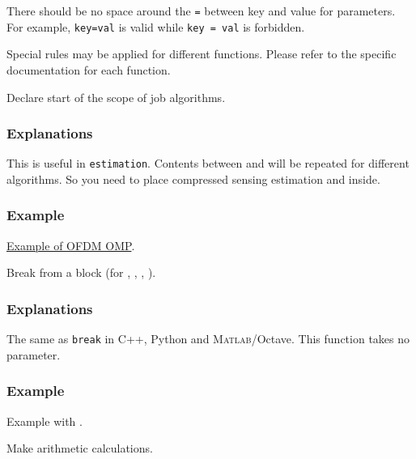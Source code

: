 \begin{warning}
  There should be no space around the \texttt{=} between key and value for parameters.
  For example, \texttt{key=val} is valid while \texttt{key = val} is forbidden.
\end{warning}

Special rules may be applied for different functions.
Please refer to the specific documentation for each function.

Declare start of the scope of job algorithms.
\subsubsection*{Explanations}
This is useful in \texttt{estimation}.
Contents between  and 
will be repeated for different algorithms.
So you need to place compressed sensing estimation
 and 
inside.
\subsubsection*{Example}
\href{https://github.com/mmcesim/examples/blob/6500ae3021e06b583897f9554e694e86584064f0/MIMO_OFDM_OMP/MIMO_wideband.sim#L90}{Example of OFDM OMP}.

Break from a block (for , , , ).
\subsubsection*{Explanations}
The same as \texttt{break} in C++, Python and \textsc{Matlab}/Octave.
This function takes no parameter.
\subsubsection*{Example}
Example with .

Make arithmetic calculations.
